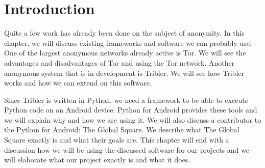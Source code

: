 \section{Introduction}
	Quite a few work has already been done on the subject of anonymity. In this chapter, we will discuss existing frameworks and software we can probably use. One of the largest anonymous networks already active is Tor. We will see the advantages and disadvantages of Tor and using the Tor network. Another anonymous system that is in development is Tribler. We will see how Tribler works and how we can extend on this software.
	
	Since Tribler is written in Python, we need a framework to be able to execute Python code on an Android device. Python for Android provides these tools and we will explain why and how we are using it. We will also discuss a contributor to the Python for Android: The Global Square. We describe what The Global Square exactly is and what their goals are. This chapter will end with a discussion how we will be using the discussed software for our projects and we will elaborate what our project exactly is and what it does.